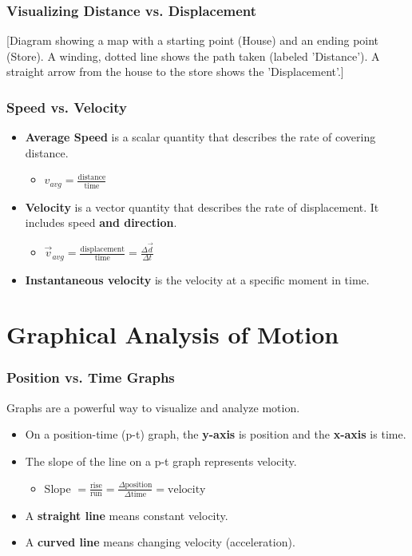 \documentclass{beamer}
\begin{document}
\begin{frame}
\frametitle{Visualizing Distance vs. Displacement}
\alert{[Diagram showing a map with a starting point (House) and an ending point (Store). A winding, dotted line shows the path taken (labeled 'Distance'). A straight arrow from the house to the store shows the 'Displacement'.]}
\end{frame}

\begin{frame}
\frametitle{Speed vs. Velocity}
\begin{itemize}
    \item \textbf{Average Speed} is a \alert{scalar} quantity that describes the rate of covering distance.
    \begin{itemize}
        \item $v_{avg} = \frac{\text{distance}}{\text{time}}$
    \end{itemize}
    \item \textbf{Velocity} is a \alert{vector} quantity that describes the rate of displacement. It includes speed \textbf{and direction}.
    \begin{itemize}
        \item $\vec{v}_{avg} = \frac{\text{displacement}}{\text{time}} = \frac{\Delta\vec{d}}{\Delta t}$
    \end{itemize}
    \item \textbf{Instantaneous velocity} is the velocity at a specific moment in time.
\end{itemize}
\end{frame}

\section{Graphical Analysis of Motion}

\begin{frame}
\frametitle{Position vs. Time Graphs}
Graphs are a powerful way to visualize and analyze motion.
\begin{itemize}
    \item On a position-time (p-t) graph, the \textbf{y-axis} is position and the \textbf{x-axis} is time.
    \item The \alert{slope} of the line on a p-t graph represents \alert{velocity}.
    \begin{itemize}
        \item Slope $= \frac{\text{rise}}{\text{run}} = \frac{\Delta \text{position}}{\Delta \text{time}} = \text{velocity}$
    \end{itemize}
    \item A \textbf{straight line} means constant velocity.
    \item A \textbf{curved line} means changing velocity (acceleration).
\end{itemize}
\end{frame}
\end{document}
